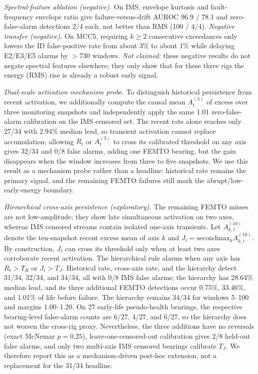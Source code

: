 \documentclass[journal]{IEEEtran}
\begin{document}
\emph{Spectral-feature ablation (negative).} On IMS, envelope kurtosis and fault-frequency envelope ratio give failure-versus-drift AUROC 96.9 / 78.1 and zero-false-alarm detections 2/4 each, not better than RMS (100 / 4/4). \emph{Negative transfer (negative).} On MCC5, requiring $k\ge2$ consecutive exceedances only lowers the ID false-positive rate from about 3\% to about 1\% while delaying E2/E3/E5 alarms by $>730$ windows. \emph{Not claimed:} these negative results do not negate spectral features elsewhere; they only show that for these three rigs the energy (RMS) rise is already a robust early signal.

\emph{Dual-scale activation mechanism probe.} To distinguish historical persistence from recent activation, we additionally compute the causal mean $A_t^{(3)}$ of excess over three monitoring snapshots and independently apply the same 1.01 zero-false-alarm calibration on the IMS censored set. The recent rate alone reaches only 27/34 with 2.94\% median lead, so transient activation cannot replace accumulation; allowing $R_t$ or $A_t^{(3)}$ to cross its calibrated threshold on any axis gives 32/34 and 0/8 false alarms, adding one FEMTO bearing, but the gain disappears when the window increases from three to five snapshots. We use this result as a mechanism probe rather than a headline: historical rate remains the primary signal, and the remaining FEMTO failures still mark the abrupt/low-early-energy boundary.

\emph{Hierarchical cross-axis persistence (exploratory).} The remaining FEMTO misses are not low-amplitude; they show late simultaneous activation on two axes, whereas IMS censored streams contain isolated one-axis transients. Let $A_{k,t}^{(10)}$ denote the ten-snapshot recent excess mean of axis $k$ and $J_t=\mathrm{secondmax}_k A_{k,t}^{(10)}$. By construction, $J_t$ can cross its threshold only when at least two axes corroborate recent activation. The hierarchical rule alarms when any axis has $R_t>T_R$ or $J_t>T_J$. Historical rate, cross-axis rate, and the hierarchy detect 31/34, 32/34, and 34/34, all with 0/8 IMS false alarms; the hierarchy has 28.64\% median lead, and its three additional FEMTO detections occur 0.75\%, 33.46\%, and 1.01\% of life before failure. The hierarchy remains 34/34 for windows 5--100 and margins 1.00--1.20. On 27 early-life pseudo-health bearings, the respective bearing-level false-alarm counts are 6/27, 4/27, and 6/27, so the hierarchy does not worsen the cross-rig proxy. Nevertheless, the three additions have no reversals (exact McNemar $p=0.25$), leave-one-censored-out calibration gives 2/8 held-out false alarms, and only two multi-axis IMS censored bearings calibrate $T_J$. We therefore report this as a mechanism-driven post-hoc extension, not a replacement for the 31/34 headline.
\end{document}
